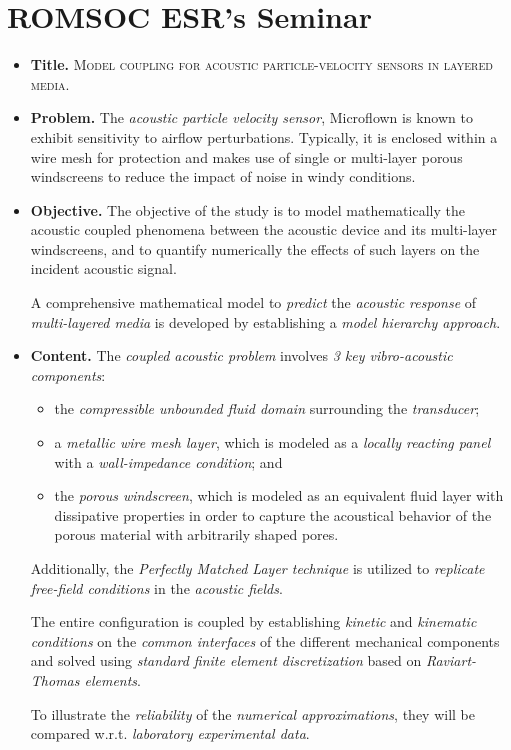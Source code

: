 \documentclass{book}
\numberwithin{equation}{section}
\begin{document}
\section{ROMSOC ESR's Seminar}
\begin{itemize}
    \item \textbf{Title.} \textsc{Model coupling for acoustic particle-velocity sensors in layered media}.
    \item \textbf{Problem.} The \textit{acoustic particle velocity sensor}, Microflown is known to exhibit sensitivity to airflow perturbations. Typically, it is enclosed within a wire mesh for protection and makes use of single or multi-layer porous windscreens to reduce the impact of noise in windy conditions.
    \item \textbf{Objective.} The objective of the study is to model mathematically the acoustic coupled phenomena between the acoustic device and its multi-layer windscreens, and to quantify numerically the effects of such layers on the incident acoustic signal.
    
    A comprehensive mathematical model to \textit{predict} the \textit{acoustic response} of \textit{multi-layered media} is developed by establishing a \textit{model hierarchy approach}.
    \item \textbf{Content.} The \textit{coupled acoustic problem} involves \textit{3 key vibro-acoustic components}:
    \begin{itemize}
        \item the \textit{compressible unbounded fluid domain} surrounding the \textit{transducer};
        \item a \textit{metallic wire mesh layer}, which is modeled as a \textit{locally reacting panel} with a \textit{wall-impedance condition}; and
        \item the \textit{porous windscreen}, which is modeled as an equivalent fluid layer with dissipative properties in order to capture the acoustical behavior of the porous material with arbitrarily shaped pores.
    \end{itemize}
    Additionally, the \textit{Perfectly Matched Layer technique} is utilized to \textit{replicate free-field conditions} in the \textit{acoustic fields}.
    
    The entire configuration is coupled by establishing \textit{kinetic} and \textit{kinematic conditions} on the \textit{common interfaces} of the different mechanical components and solved using \textit{standard finite element discretization} based on \textit{Raviart-Thomas elements}.
    
    To illustrate the \textit{reliability} of the \textit{numerical approximations}, they will be compared w.r.t. \textit{laboratory experimental data}.
\end{itemize}
\end{document}
